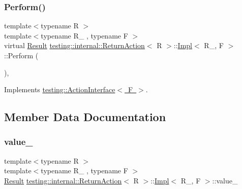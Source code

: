 \subsubsection{\texorpdfstring{Perform()}{Perform()}\hspace{0.1cm}{\footnotesize\ttfamily [3/3]}}
{\footnotesize\ttfamily template$<$typename R $>$ \\
template$<$typename R\+\_\+ , typename F $>$ \\
virtual \mbox{\hyperlink{classtesting_1_1_action_interface_a7477de2fe3e4e01c59db698203acaee7}{Result}} \mbox{\hyperlink{classtesting_1_1internal_1_1_return_action}{testing\+::internal\+::\+Return\+Action}}$<$ R $>$\+::\mbox{\hyperlink{classtesting_1_1internal_1_1_return_action_1_1_impl}{Impl}}$<$ R\+\_\+, F $>$\+::Perform (\begin{DoxyParamCaption}\item[{const \mbox{\hyperlink{classtesting_1_1_action_interface_af72720d864da4d606629e83edc003511}{Argument\+Tuple}} \&}]{ }\end{DoxyParamCaption})\hspace{0.3cm}{\ttfamily [inline]}, {\ttfamily [virtual]}}



Implements \mbox{\hyperlink{classtesting_1_1_action_interface_a20f8624fcea1786f2992b358760422a0}{testing\+::\+Action\+Interface$<$ F $>$}}.



\subsection{Member Data Documentation}
\mbox{\label{classtesting_1_1internal_1_1_return_action_1_1_impl_a75916c30e7f8bb0388f3313788f25fa5}} 
\subsubsection{\texorpdfstring{value\_}{value\_}}
{\footnotesize\ttfamily template$<$typename R $>$ \\
template$<$typename R\+\_\+ , typename F $>$ \\
\mbox{\hyperlink{classtesting_1_1_action_interface_a7477de2fe3e4e01c59db698203acaee7}{Result}} \mbox{\hyperlink{classtesting_1_1internal_1_1_return_action}{testing\+::internal\+::\+Return\+Action}}$<$ R $>$\+::\mbox{\hyperlink{classtesting_1_1internal_1_1_return_action_1_1_impl}{Impl}}$<$ R\+\_\+, F $>$\+::value\+\_\+\hspace{0.3cm}{\ttfamily [private]}}

